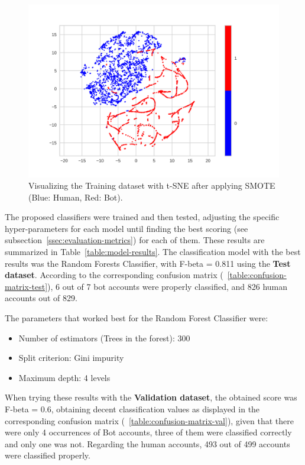 \documentclass[a4paper, 12pt]{book}
\begin{document}
\begin{figure}
 \centering
  \includegraphics[width=15cm, keepaspectratio]{img/data-tsne-smote.png}
  \caption{Visualizing the Training dataset with t-SNE after applying SMOTE (Blue: Human, Red: Bot).}
  \label{fig:data-tsne-smote}
\end{figure}

The proposed classifiers were trained and then tested, adjusting the specific hyper-parameters for each model until finding the best scoring (see subsection~\ref{ssec:evaluation-metrics}) for each of them. These results are summarized in Table~\ref{table:model-results}. The classification model with the best results was the Random Forests Classifier, with F-beta = 0.811 using the \textbf{Test dataset}. According to the corresponding confusion matrix (~\ref{table:confusion-matrix-test}), 6 out of 7 bot accounts were properly classified, and 826 human accounts out of 829.

The parameters that worked best for the Random Forest Classifier were:
\begin{itemize}
    \item Number of estimators (Trees in the forest): 300
    \item Split criterion: Gini impurity
    \item Maximum depth: 4 levels
\end{itemize}

When trying these results with the \textbf{Validation dataset}, the obtained score was F-beta = 0.6, obtaining decent classification values as displayed in the corresponding confusion matrix (~\ref{table:confusion-matrix-val}), given that there were only 4 occurrences of Bot accounts, three of them were classified correctly and only one was not. Regarding the human accounts, 493 out of 499 accounts were classified properly.
\end{document}
